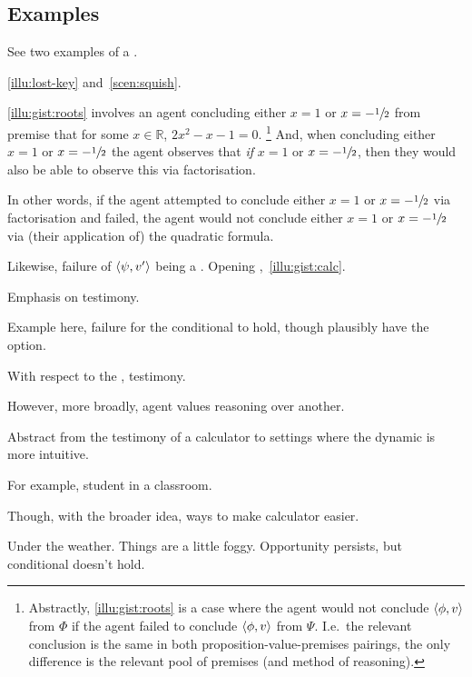 \subsection{Examples}
\label{cha:zS:sec:requs:examples}

\begin{note}
  See two examples of a \requ{}.

  \autoref{illu:lost-key} and~\autoref{scen:squish}.
\end{note}

\begin{note}[Example]
  \autoref{illu:gist:roots} involves an agent concluding either \(x = 1\) or \(x = -\sfrac{1}{2}\) from premise that for some \(x \in \mathbb{R}\), \(2x^{2} - x - 1 = 0\).%
  \footnote{
    Abstractly, \autoref{illu:gist:roots} is a case where the agent would not conclude \(\langle \phi, v \rangle\) from \(\Phi\) if the agent failed to conclude \(\langle \phi, v \rangle\) from \(\Psi\).
    I.e.\ the relevant conclusion is the same in both proposition-value-premises pairings, the only difference is the relevant pool of premises (and method of reasoning).
  }
  And, when concluding either \(x = 1\) or \(x = -\sfrac{1}{2}\) the agent observes that \emph{if} \(x = 1\) or \(x = -\sfrac{1}{2}\), then they would also be able to observe this via factorisation.

  In other words, if the agent attempted to conclude either \(x = 1\) or \(x = -\sfrac{1}{2}\) via factorisation and failed, the agent would not conclude either \(x = 1\) or \(x = -\sfrac{1}{2}\) via (their application of) the quadratic formula.
\end{note}

\begin{note}[Calculator]
  Likewise, failure of \(\langle \psi, v' \rangle\) being a \requ{}.
  Opening \scen{},~\autoref{illu:gist:calc}.

  Emphasis on testimony.

  Example here, failure for the conditional to hold, though plausibly have the option.

  With respect to the , testimony.

  However, more broadly, agent values reasoning over another.

  Abstract from the testimony of a calculator to settings where the dynamic is more intuitive.

  For example, student in a classroom.

  Though, with the broader idea, ways to make calculator easier.

  Under the weather.
  Things are a little foggy.
  Opportunity persists, but conditional doesn't hold.
\end{note}

